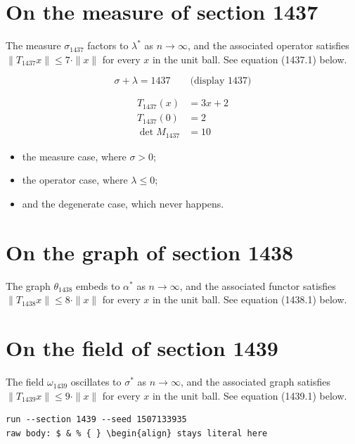 \documentclass{article}
\begin{document}
\section{On the measure of section 1437}
The measure $\sigma_{1437}$ factors to $\lambda^{*}$ as $n \to \infty$,
and the associated operator satisfies $\|T_{1437} x\| \leq 7 \cdot \|x\|$
for every $x$ in the unit ball. See equation (1437.1) below.

$$
\sigma + \lambda = 1437 \qquad \text{(display 1437)}
$$

\begin{align}
T_{1437}(x) &= 3 x + 2 \\
T_{1437}(0) &= 2 \\
\det M_{1437} &= 10
\end{align}

\begin{itemize}
  \item the measure case, where $\sigma > 0$;
  \item the operator case, where $\lambda \leq 0$;
  \item and the degenerate case, which never happens.
\end{itemize}

\section{On the graph of section 1438}
The graph $\theta_{1438}$ embeds to $\alpha^{*}$ as $n \to \infty$,
and the associated functor satisfies $\|T_{1438} x\| \leq 8 \cdot \|x\|$
for every $x$ in the unit ball. See equation (1438.1) below.

\section{On the field of section 1439}
The field $\omega_{1439}$ oscillates to $\sigma^{*}$ as $n \to \infty$,
and the associated graph satisfies $\|T_{1439} x\| \leq 9 \cdot \|x\|$
for every $x$ in the unit ball. See equation (1439.1) below.

\begin{verbatim}
run --section 1439 --seed 1507133935
raw body: $ & % { } \begin{align} stays literal here
\end{verbatim}
\end{document}
